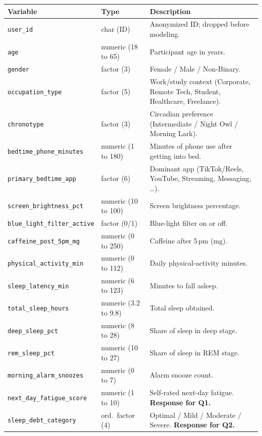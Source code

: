 \documentclass[10pt]{article}
\begin{document}
\footnotesize
\begin{tabularx}{\textwidth}{p{1.3in}p{1.05in}X}
\toprule
\textbf{Variable} & \textbf{Type} & \textbf{Description} \\
\midrule
\texttt{user\_id} & char (ID) & Anonymized ID; dropped before modeling. \\
\texttt{age} & numeric (18 to 65) & Participant age in years. \\
\texttt{gender} & factor (3) & Female / Male / Non-Binary. \\
\texttt{occupation\_type} & factor (5) & Work/study context (Corporate, Remote Tech, Student, Healthcare, Freelance). \\
\texttt{chronotype} & factor (3) & Circadian preference (Intermediate / Night Owl / Morning Lark). \\
\texttt{bedtime\_phone\_minutes} & numeric (1 to 180) & Minutes of phone use after getting into bed. \\
\texttt{primary\_bedtime\_app} & factor (6) & Dominant app (TikTok/Reels, YouTube, Streaming, Messaging, \ldots). \\
\texttt{screen\_brightness\_pct} & numeric (10 to 100) & Screen brightness percentage. \\
\texttt{blue\_light\_filter\_active} & factor (0/1) & Blue-light filter on or off. \\
\texttt{caffeine\_post\_5pm\_mg} & numeric (0 to 250) & Caffeine after 5\,pm (mg). \\
\texttt{physical\_activity\_min} & numeric (0 to 112) & Daily physical-activity minutes. \\
\texttt{sleep\_latency\_min} & numeric (6 to 123) & Minutes to fall asleep. \\
\texttt{total\_sleep\_hours} & numeric (3.2 to 9.8) & Total sleep obtained. \\
\texttt{deep\_sleep\_pct} & numeric (8 to 28) & Share of sleep in deep stage. \\
\texttt{rem\_sleep\_pct} & numeric (10 to 27) & Share of sleep in REM stage. \\
\texttt{morning\_alarm\_snoozes} & numeric (0 to 7) & Alarm snooze count. \\
\texttt{next\_day\_fatigue\_score} & numeric (1 to 10) & Self-rated next-day fatigue. \textbf{Response for Q1.} \\
\texttt{sleep\_debt\_category} & ord.\ factor (4) & Optimal / Mild / Moderate / Severe. \textbf{Response for Q2.} \\
\bottomrule
\end{tabularx}
\normalsize
\end{document}
